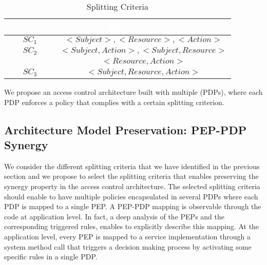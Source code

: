 \begin{table}[h!]
\centering
\setlength{\extrarowheight}{6 pt}
\begin{tabular}{|>{\small}c|>{\small}c|} 
\hline  \rowcolor{black} 
 \bf
\textcolor{white}{Categories}& \bf \textcolor{white}{Splitting Criteria}\\ \hline
 $SC_{1}$& {$<Subject>, <Resource>, <Action>$}\\ \hline

$SC_{2}$& {$<Subject,Action>, <Subject,Resource>$}\\&{$<Resource,Action>$}\\  \hline

$SC_{3}$& {$<Subject,Resource,Action>$}\\ \hline
\end{tabular}
\caption{Splitting Criteria}

\label{table1}\end{table}

We propose an access control architecture built with multiple (PDPs), where each PDP enforces
a policy that complies with a certain splitting criterion. 

\subsection{Architecture Model Preservation: PEP-PDP Synergy}
We consider the different splitting criteria that we have identified in the previous section and we propose to select the splitting 
criteria that enables preserving the synergy property in the access control architecture.
The selected splitting criteria should enable to have multiple policies encapsulated in several PDPs 
where each PDP is mapped to a single PEP.
A PEP-PDP mapping is observable through the code at application level. In fact, a deep analysis of the PEPs and 
the corresponding triggered rules, enables to explicitly describe this mapping. At the application level, every PEP is mapped to a 
service implementation through a system method call that triggers a decision making process by activating some specific rules in a single 
PDP.

